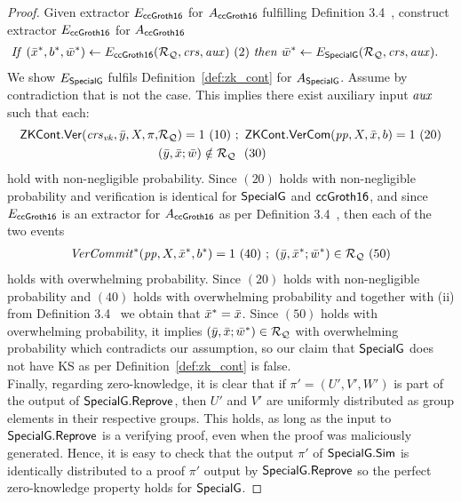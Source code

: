 \begin{proof}
\noindent Given extractor $E_{{\mathsf{ccGroth16}}}$ for $A_{{\mathsf{ccGroth16}}}$ fulfilling Definition 3.4~\cite{LegoSNARK}, 
construct extractor $E_{{\mathsf{ccGroth16}}}$ for $A_{{\mathsf{ccGroth16}}}$
\begin{align*}
&\mathit{If} \ (\bar{x}^*, b^*, \bar{w}^*) \leftarrow E_{{\mathsf{ccGroth16}}} (\mathcal{R}_{\mathcal{Q}}, \mathit{crs}, \mathit{aux})\ (2)\ \mathit{then} \ \bar{w}^* \leftarrow E_{{\mathsf{SpecialG}}} (\mathcal{R}_{\mathcal{Q}}, \mathit{crs}, \mathit{aux}).
\end{align*}
We show $E_{{\mathsf{SpecialG}}}$ fulfils Definition~\ref{def:zk_cont} for $A_{{\mathsf{SpecialG}}}$. Assume by contradiction that is not the case. 
This implies there exist auxiliary input $\mathit{aux}$ such that each: 
\begin{align*}
\ZKCont.\Verify(\crsvk, \bary, X, \pi, &\relRQ) =1 \ (10)\ ; \ \ZKCont.\VerifyCom(\pp, X, \barx, b) =1 \ (20) \\
& (\bary, \barx; \baromega) \notin \relRQ  \ \ (30) 
\end{align*}
hold with non-negligible probability. Since $(20)$ holds with non-negligible probability and verification is identical for 
${\mathsf{SpecialG}}$ and ${\mathsf{ccGroth16}}$, and since $E_{{\mathsf{ccGroth16}}}$ is an extractor for $A_{{\mathsf{ccGroth16}}}$ as per Definition 3.4~\cite{LegoSNARK},
 then each of the two events 
\begin{align*}
\mathit{VerCommit^*}(\mathit{pp}, X, \bar{x}^*, b^*) =1 \ (40) \ ; \ (\bar{y}, \bar{x}^*; \bar{w}^*) \in  \mathcal{R}_{\mathcal{Q}} \ (50)
\end{align*}
holds with overwhelming probability. Since $(20)$ holds with non-negligible probability and $(40)$ holds with overwhelming probability and 
together with (ii) from Definition 3.4~\cite{LegoSNARK} we obtain that $\bar{x}^* = \bar{x}$. Since $(50)$ holds with overwhelming probability, it implies 
$(\bar{y}, \bar{x}; \bar{w}^*) \in \mathcal{R}_{\mathcal{Q}} $ with overwhelming probability which contradicts our assumption, so our claim that ${\mathsf{SpecialG}}$ does not have 
KS as per Definition~\ref{def:zk_cont} is false. \\

\noindent Finally, regarding zero-knowledge, it is clear that if $\pi' = (U', V', W')$ is part of the output of ${\mathsf{SpecialG}}.{\mathsf{Reprove}}$, 
then $U'$ and $V'$ are uniformly distributed as group elements in their respective groups. This holds, as long as the 
input to ${\mathsf{SpecialG}}.{\mathsf{Reprove}}$ is a verifying proof, even when the proof was maliciously generated. Hence, it is easy to check  
that the output $\pi'$ of ${\mathsf{SpecialG}}.{\mathsf{Sim}}$ is identically distributed to a proof $\pi'$ output by ${\mathsf{SpecialG}}.{\mathsf{Reprove}}$ so the perfect 
zero-knowledge property holds for ${\mathsf{SpecialG}}$. 
\end{proof}


